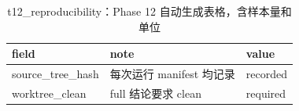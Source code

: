 \begin{table}[htbp]
\centering
\caption{t12_reproducibility：Phase 12 自动生成表格，含样本量和单位}
\begin{tabular}{lll}
\hline
field & note & value \\
\hline
source\_tree\_hash & 每次运行 manifest 均记录 & recorded \\
worktree\_clean & full 结论要求 clean & required \\
\hline
\end{tabular}
\end{table}

